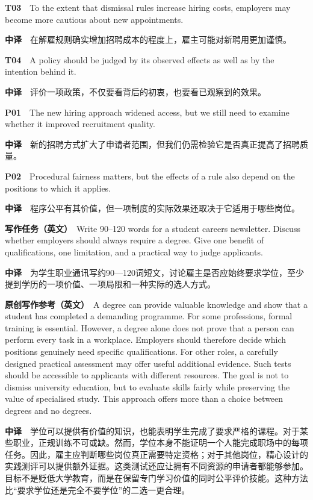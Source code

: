 \documentclass[
  11pt,
]{ctexart}
\begin{document}
\textbf{T03}　To the extent that dismissal rules increase hiring costs,
employers may become more cautious about new appointments.

\textbf{中译}　在解雇规则确实增加招聘成本的程度上，雇主可能对新聘用更加谨慎。

\textbf{T04}　A policy should be judged by its observed effects as well
as by the intention behind it.

\textbf{中译}　评价一项政策，不仅要看背后的初衷，也要看已观察到的效果。

\textbf{P01}　The new hiring approach widened access, but we still need
to examine whether it improved recruitment quality.

\textbf{中译}　新的招聘方式扩大了申请者范围，但我们仍需检验它是否真正提高了招聘质量。

\textbf{P02}　Procedural fairness matters, but the effects of a rule
also depend on the positions to which it applies.

\textbf{中译}　程序公平有其价值，但一项制度的实际效果还取决于它适用于哪些岗位。

\textbf{写作任务（英文）}　Write 90--120 words for a student careers
newsletter. Discuss whether employers should always require a degree.
Give one benefit of qualifications, one limitation, and a practical way
to judge applicants.

\textbf{中译}　为学生职业通讯写约90---120词短文，讨论雇主是否应始终要求学位，至少提到学历的一项价值、一项局限和一种实际的选人方式。

\textbf{原创写作参考（英文）}　A degree can provide valuable knowledge
and show that a student has completed a demanding programme. For some
professions, formal training is essential. However, a degree alone does
not prove that a person can perform every task in a workplace. Employers
should therefore decide which positions genuinely need specific
qualifications. For other roles, a carefully designed practical
assessment may offer useful additional evidence. Such tests should be
accessible to applicants with different resources. The goal is not to
dismiss university education, but to evaluate skills fairly while
preserving the value of specialised study. This approach offers more
than a choice between degrees and no degrees.

\textbf{中译}　学位可以提供有价值的知识，也能表明学生完成了要求严格的课程。对于某些职业，正规训练不可或缺。然而，学位本身不能证明一个人能完成职场中的每项任务。因此，雇主应判断哪些岗位真正需要特定资格；对于其他岗位，精心设计的实践测评可以提供额外证据。这类测试还应让拥有不同资源的申请者都能够参加。目标不是贬低大学教育，而是在保留专门学习价值的同时公平评价技能。这种方法比``要求学位还是完全不要学位''的二选一更合理。
\end{document}
